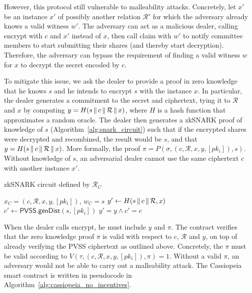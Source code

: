 However, this protocol still vulnerable to malleability attacks.
Concretely, let $x'$ be an instance $x'$ of possibly another relation $\mathcal{R}'$ for which the adversary already knows a valid witness $w'$.
The adversary can act as a malicious dealer, calling \textsf{encrypt} with $c$ and $x'$ instead of $x$, then call \textsf{claim} with $w'$ to notify committee members to start submitting their shares (and thereby start decryption).
Therefore, the adversary can bypass the requirement of finding a valid witness $w$ for $x$ to decrypt the secret encoded by $c$.

To mitigate this issue, we ask the dealer to provide a proof in zero knowledge that he knows $s$ and he intends to encrypt $s$ with the instance $x$.
In particular, the dealer generates a commitment to the secret and ciphertext, tying it to $\mathcal{R}$ and $x$ by computing $y = H(s \,\|\, c \,\|\, \mathcal{R} \,\|\, x)$, where $H$ is a hash function that approximates a random oracle.
The dealer then generates a zkSNARK proof of knowledge of $s$ (Algorithm~\ref{alg:snark_circuit}) such that if the encrypted shares were decrypted and recombined, the result would be $s$, and that $y = H(s \,\|\, c \,\|\, \mathcal{R} \,\|\, x)$.
More formally, the proof $\pi = P(\sigma, (c, \mathcal{R}, x, y, [pk_i]), s)$.
Without knowledge of $s$, an adversarial dealer cannot use the same ciphertext $c$ with another instance $x'$.

\begin{algorithm}
    \caption{zkSNARK circuit defined by $\mathcal{R}_C$}
    \label{alg:snark_circuit}
    \begin{algorithmic}[1]
        \Require $x_C = (c, \mathcal{R}, x, y, [pk_i])$, $w_C = s$
        \State $y' \gets H(s \,\|\, c \,\|\, \mathcal{R}, x)$
        \State $c' \gets \textsf{PVSS.genDist}(s, [pk_i])$
        \State \Return $y' = y \land c' = c$
    \end{algorithmic}
\end{algorithm}

When the dealer calls \textsf{encrypt}, he must include $y$ and $\pi$.
The contract verifies that the zero knowledge proof $\pi$ is valid with respect to $c$, $\mathcal{R}$ and $y$, on top of already verifying the PVSS ciphertext as outlined above.
Concretely, the $\pi$ must be valid according to $V(\tau, (c, \mathcal{R}, x, y, [pk_i]), \pi) = 1$.
Without a valid $\pi$, an adversary would not be able to carry out a malleability attack.
The Cassiopeia smart contract is written in pseudocode in Algorithm~\ref{alg:cassiopeia_no_incentives}.

